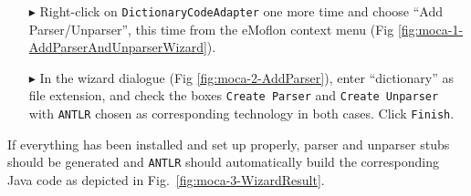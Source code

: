 \begin{enumerate}

\item[$\blacktriangleright$] Right-click on \texttt{DictionaryCodeAdapter} one more time and choose ``Add Parser/Unparser'', this time from the eMoflon context
menu (Fig \ref{fig:moca-1-AddParserAndUnparserWizard}).

 
\item[$\blacktriangleright$] In the wizard dialogue (Fig \ref{fig:moca-2-AddParser}), enter ``dictionary'' as file extension, and check the boxes \texttt{Create
Parser} and \texttt{Create Unparser} with \texttt{ANTLR} chosen as corresponding technology in both cases.  Click \texttt{Finish}.


\end{enumerate}

If everything has been installed and set up properly, parser and unparser stubs should be generated and \texttt{ANTLR} should automatically build the
corresponding Java code as depicted in Fig.~\ref{fig:moca-3-WizardResult}.

